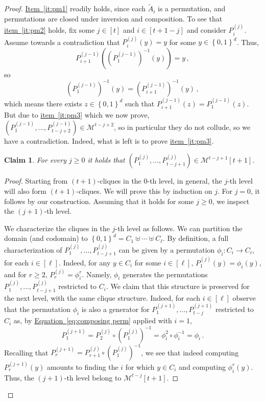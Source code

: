 \documentclass[11pt]{article}
\numberwithin{equation}{section}
\newtheorem{claim}[theorem]{Claim}
\theoremstyle{definition}
\theoremstyle{plain}
\newcommand{\expeqref}[2]{\hyperref[#2]{#1~\eqref{#2}}}
\newcommand{\set}[1]{\left\{{#1}\right\}}
\newcommand{\B}{\set{0,1}}
\def\MM{{\mathcal{M}}}
\begin{document}
\begin{proof}
\expeqref{Item}{it:pm1} readily holds, since each $\widetilde{A}_i$ is a permutation, and permutations are closed
under inversion and composition. To see that \expeqref{item}{it:pm2} holds, fix some
$j \in [t]$ and $i \in [t+1-j]$ and consider $P_{i}^{(j)}$. Assume
towards a contradiction that $P_{i}^{(j)}(y) = y$ for some $y \in \B^d$. Thus,
\[
P_{i+1}^{(j-1)} \left( \left(P_{1}^{(j-1)}\right)^{-1}(y)\right) = y\,,
\]
so
\[
\left(P_{1}^{(j-1)}\right)^{-1}(y) = \left( P_{i+1}^{(j-1)} \right)^{-1}(y)\,,
\]
which means there exists $z \in \B^d$ such that $P_{i+1}^{(j-1)}(z) = P_{1}^{(j-1)}(z)$.
But due to \expeqref{item}{it:pm3} which we now prove, $\left( P_{1}^{(j-1)},\ldots,P_{t-j+2}^{(j-1)} \right) \in \MM^{t-j+2}$,
so in particular they do not collude, so we have a contradiction. Indeed, what is left is 
to prove \expeqref{item}{it:pm3}.
\begin{claim}
For every $j \ge 0$ it holds that $( P_{1}^{(j)},\ldots,P_{t-j+1}^{(j)} ) \in \MM^{t-j+1}[t+1]$.
\end{claim}
\begin{proof}
Starting from $(t+1)$-cliques in the $0$-th level, in general, the $j$-th level
will also form $(t+1)$-cliques. We will prove this by induction on $j$. For $j = 0$, it follows
by our construction. Assuming that it holds for some $j \ge 0$, we inspect the $(j+1)$-th level.

We characterize the cliques in the $j$-th level as follows. We can partition the domain (and codomain)
to $\B^d = C_1 \uplus \cdots \uplus C_{\ell}$. By definition, a full characterization of
$P_1^{(j)},\ldots,P_{t-j+1}^{(j)}$ can be given by a permutation
$\phi_i \colon C_i \rightarrow C_i$, for each $i \in [\ell]$. Indeed, 
for any $y \in C_i$ for some $i \in [\ell]$, $P_{1}^{(j)}(y) = \phi_{i}(y)$, and
for $r \ge 2$, $P_{r}^{(j)} = \phi_{i}^r$. Namely, $\phi_i$ generates the permutations $P_1^{(j)},\ldots,P_{t-j+1}^{(j)}$ restricted to $C_i$.
We claim that this structure is preserved for the next level, with the same clique structure. Indeed, for each $i \in [\ell]$ observe that the permutation ${\phi}_i$ is also a generator for $P_1^{(j+1)},\ldots,P_{t-j}^{(j+1)}$ restricted to $C_i$ as, by \expeqref{Equation}{eq:composing perm} applied with $i=1$,
\[
P^{(j+1)}_{1} = P_{2}^{(j)} \circ \left( P_{1}^{(j)} \right)^{-1} = \phi_i^2 \circ \phi_i^{-1} = \phi_i\,.
\]
%
%
%
Recalling that $P^{(j+1)}_{r} = P_{r+1}^{(j)} \circ \left( P_{1}^{(j)} \right)^{-1}$, we see that indeed
computing $P^{(j+1)}_{r}(y)$ amounts to finding the $i$ for which $y \in C_i$
and computing $\phi_i^r(y)$. Thus, the $(j+1)$-th level belong to $\MM^{t-j}[t+1]$.
\end{proof}
\end{proof}
\end{document}
